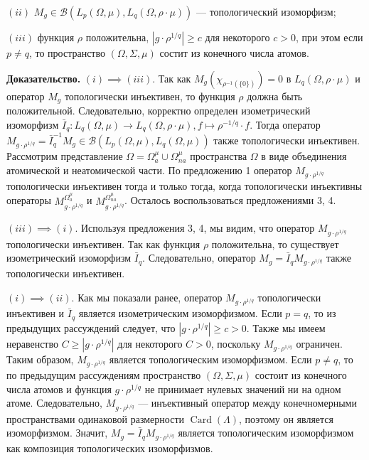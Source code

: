 \documentclass[11pt,twoside]{article}
\begin{document}
$(ii)$ $M_g\in\mathcal{B}(L_p(\Omega,\mu),L_q(\Omega,\rho\cdot\mu))$ ---
топологический изоморфизм;

$(iii)$ функция $\rho$ положительна, $|g\cdot \rho^{1/q}|\geq c$ для
некоторого $c>0$, при этом если $p\neq q$, то пространство
$(\Omega,\Sigma,\mu)$ состит из конечного числа атомов.

\textbf{Доказательство.} $(i)$$\implies$$ (iii)$. Так как
$M_g(\chi_{\rho^{-1}(\{0\})})=0$ в $L_q(\Omega,\rho\cdot\mu)$ и оператор
$M_g$ топологически инъективен, то функция $\rho$ должна быть положительной.
Следовательно, корректно определен изометрический изоморфизм
$\bar{I}_q:L_q(\Omega,\mu)\to L_q(\Omega,\rho\cdot\mu),f\mapsto
\rho^{-1/q}\cdot f$. Тогда оператор $M_{g\cdot\rho^{1/q}}=\bar{I}_q^{-1}
M_g\in\mathcal{B}(L_p(\Omega,\mu),L_q(\Omega,\mu))$ также топологически
инъективен. Рассмотрим представление
$\Omega=\Omega_a^{\mu}\cup\Omega_{na}^{\mu}$ пространства $\Omega$ в виде
объединения атомической и неатомической части. По предложению  1 оператор
$M_{g\cdot\rho^{1/q}}$ топологически инъективен тогда и только тогда, когда
топологически инъективны операторы $M_{g\cdot\rho^{1/q}}^{\Omega_a^{\mu}}$ и
$M_{g\cdot\rho^{1/q}}^{\Omega_{na}^{\mu}}$. Осталось воспользоваться
предложениями 3, 4.

$(iii)$$\implies$$ (i)$. Используя предложения 3, 4, мы видим, что оператор
$M_{g\cdot\rho^{1/q}}$ топологически инъективен. Так как функция $\rho$
положительна, то существует изометрический изоморфизм $\bar{I}_q$.
Следовательно, оператор $M_g=\bar{I}_q M_{g\cdot\rho^{1/q}}$ также
топологически инъективен.

$(i)$$\implies$$ (ii)$. Как мы показали ранее, оператор
$M_{g\cdot\rho^{1/q}}$ топологически инъективен и $\bar{I}_q$ является
изометрическим изоморфизмом. Если $p=q$, то из предыдущих рассуждений
следует, что $|{g\cdot\rho^{1/q}}|\geq c>0$. Также мы имеем неравенство
$C\geq |{g\cdot\rho^{1/q}}|$ для некоторого $C>0$, поскольку
$M_{{g\cdot\rho^{1/q}}}$ ограничен. Таким образом,
$M_{{g\cdot\rho^{1/q}}}$ является топологическим изоморфизмом. Если
$p\neq q$, то по предыдущим рассуждениям пространство
$(\Omega,\Sigma,\mu)$ состоит из конечного числа атомов и функция
$g\cdot\rho^{1/q}$ не принимает нулевых значений ни на одном атоме.
Следовательно, $M_{g\cdot\rho^{1/q}}$ --- инъективный оператор между
конечномерными пространствами одинаковой размерности
$\operatorname{Card}(\Lambda)$, поэтому он является изоморфизмом.
Значит, $M_g=\bar{I}_q M_{g\cdot\rho^{1/q}}$ является топологическим
изоморфизмом как композиция топологических изоморфизмов.
\end{document}
